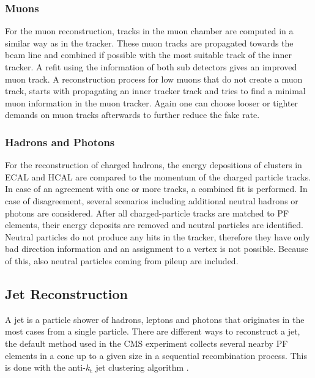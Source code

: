 \subsubsection*{Muons}
For the muon reconstruction, tracks in the muon chamber are computed in a similar way as in the tracker. These muon tracks are propagated towards the beam line and combined if possible with the most suitable track of the inner tracker. A refit using the information of both sub detectors gives an improved muon track. A reconstruction process for low \pt muons that do not create a muon track, starts with propagating an inner tracker track and tries to find a minimal muon information in the muon tracker. Again one can choose looser or tighter demands on muon tracks afterwards to further reduce the fake rate.

\subsubsection*{Hadrons and Photons}
For the reconstruction of charged hadrons, the energy depositions of clusters in ECAL and HCAL are compared to the momentum of the charged particle tracks. In case of an agreement with one or more tracks, a combined fit is performed. In case of disagreement, several scenarios including additional neutral hadrons or photons are considered. After all charged-particle tracks are matched to PF elements, their energy deposits are removed and neutral particles are identified. Neutral particles do not produce any hits in the tracker, therefore they have only bad direction information and an assignment to a vertex is not possible. Because of this, also neutral particles coming from pileup are included.

\subsection{Jet Reconstruction}
A jet is a particle shower of hadrons, leptons and photons that originates in the most cases from a single particle. There are different ways to reconstruct a jet, the default method used in the CMS experiment collects several nearby PF elements in a cone up to a given size in a sequential recombination process. This is done with the anti-$k_\textrm{t}$ jet clustering algorithm \cite{antikt}. \\


